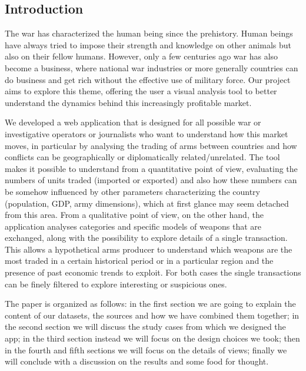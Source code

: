 \documentclass{article}
\begin{document}
\begin{multicols}{2}

\section*{Introduction}
%
The war has characterized the human being since the prehistory. Human beings have always tried to impose their strength and knowledge on other animals but also on their fellow humans. However, only a few centuries ago war has also become a business, where national war industries or more generally countries can do business and get rich without the effective use of military force. Our project aims to explore this theme, offering the user a visual analysis tool to better understand the dynamics behind this increasingly profitable market.

We developed a web application that is designed for all possible war or investigative operators or journalists who want to understand how this market moves, in particular by analysing the trading of arms between countries and how conflicts can be geographically or diplomatically related/unrelated. The tool makes it possible to understand from a quantitative point of view, evaluating the numbers of units traded (imported or exported) and also how these numbers can be somehow influenced by other parameters characterizing the country (population, GDP, army dimensions), which at first glance may seem detached from this area. From a qualitative point of view, on the other hand, the application analyses categories and specific models of weapons that are exchanged, along with the possibility to explore details of a single transaction. This allows a hypothetical arms producer to understand which weapons are the most traded in a certain historical period or in a particular region and the presence of past economic trends to exploit. 
For both cases the single transactions can be finely filtered to explore interesting or suspicious ones.

The paper is organized as follows: in the first section we are going to explain the content of our datasets, the sources and how we have combined them together; in the second section we will discuss the study cases from which we designed the app; in the third section instead we will focus on the design choices we took; then in the fourth and fifth sections we will focus on the details of views; finally we will conclude with a discussion on the results and some food for thought.


\end{multicols}
\end{document}
